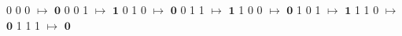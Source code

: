 0 0 0 $\mapsto$ $\mathbf{0}$
0 0 1 $\mapsto$ $\mathbf{1}$
0 1 0 $\mapsto$ $\mathbf{0}$
0 1 1 $\mapsto$ $\mathbf{1}$
1 0 0 $\mapsto$ $\mathbf{0}$
1 0 1 $\mapsto$ $\mathbf{1}$
1 1 0 $\mapsto$ $\mathbf{0}$
1 1 1 $\mapsto$ $\mathbf{0}$

